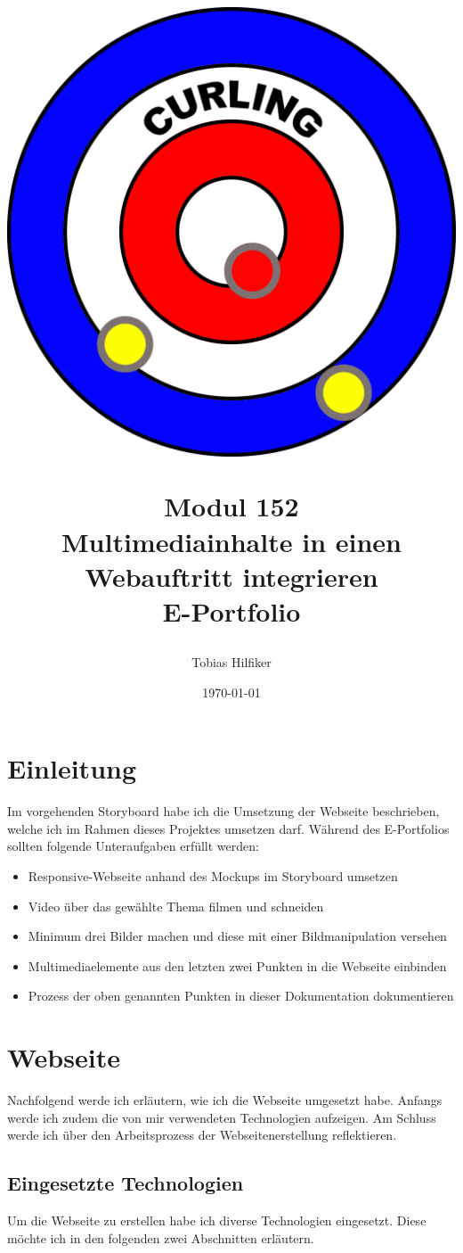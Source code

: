 \documentclass[11pt]{article}
\title{
    \includegraphics[width=\textwidth]{media/curling_logo}
    \begin{center}
        Modul 152 \\
        Multimediainhalte in einen Webauftritt integrieren\\
        E-Portfolio
    \end{center}}
\author{Tobias Hilfiker}
\date{\today}
\begin{document}
    \begin{titlingpage}
        \maketitle
    \end{titlingpage}
    \pagebreak

    \tableofcontents
    \pagebreak

    \section{Einleitung}
    Im vorgehenden Storyboard habe ich die Umsetzung der Webseite beschrieben, welche ich im Rahmen dieses Projektes umsetzen darf. Während des
    E-Portfolios sollten folgende Unteraufgaben erfüllt werden:

    \begin{itemize}
        \item Responsive-Webseite anhand des Mockups im Storyboard umsetzen
        \item Video über das gewählte Thema filmen und schneiden
        \item Minimum drei Bilder machen und diese mit einer Bildmanipulation versehen
        \item Multimediaelemente aus den letzten zwei Punkten in die Webseite einbinden
        \item Prozess der oben genannten Punkten in dieser Dokumentation dokumentieren
    \end{itemize}
    \pagebreak

    \section{Webseite}
    Nachfolgend werde ich erläutern, wie ich die Webseite umgesetzt habe. Anfangs werde ich zudem die von mir verwendeten Technologien aufzeigen.
    Am Schluss werde ich über den Arbeitsprozess der Webseitenerstellung reflektieren.

    \subsection{Eingesetzte Technologien}
    Um die Webseite zu erstellen habe ich diverse Technologien eingesetzt. Diese möchte ich in den folgenden zwei Abschnitten erläutern.
\end{document}
